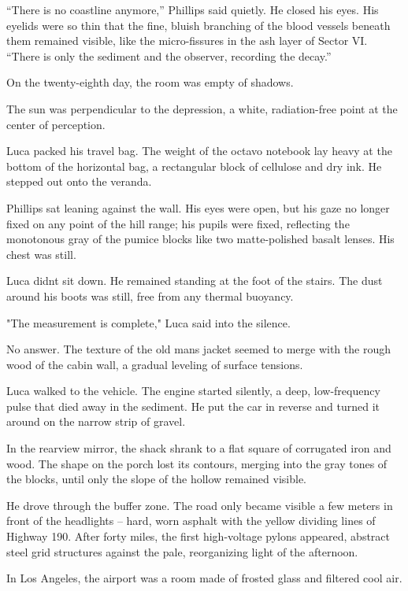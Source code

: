 \documentclass[
  ngerman,
]{article}
\begin{document}
``There is no coastline anymore,'' Phillips said quietly. He closed his
eyes. His eyelids were so thin that the fine, bluish branching of the
blood vessels beneath them remained visible, like the micro-fissures in
the ash layer of Sector VI. ``There is only the sediment and the
observer, recording the decay.''

On the twenty-eighth day, the room was empty of shadows.

The sun was perpendicular to the depression, a white, radiation-free
point at the center of perception.

Luca packed his travel bag. The weight of the octavo notebook lay heavy
at the bottom of the horizontal bag, a rectangular block of cellulose
and dry ink. He stepped out onto the veranda.

Phillips sat leaning against the wall. His eyes were open, but his gaze
no longer fixed on any point of the hill range; his pupils were fixed,
reflecting the monotonous gray of the pumice blocks like two
matte-polished basalt lenses. His chest was still.

Luca didn\textquotesingle t sit down. He remained standing at the foot
of the stairs. The dust around his boots was still, free from any
thermal buoyancy.

"The measurement is complete," Luca said into the silence.

No answer. The texture of the old man\textquotesingle s jacket seemed to
merge with the rough wood of the cabin wall, a gradual leveling of
surface tensions.

Luca walked to the vehicle. The engine started silently, a deep,
low-frequency pulse that died away in the sediment. He put the car in
reverse and turned it around on the narrow strip of gravel.

In the rearview mirror, the shack shrank to a flat square of corrugated
iron and wood. The shape on the porch lost its contours, merging into
the gray tones of the blocks, until only the slope of the hollow
remained visible.

He drove through the buffer zone. The road only became visible a few
meters in front of the headlights -- hard, worn asphalt with the yellow
dividing lines of Highway 190. After forty miles, the first high-voltage
pylons appeared, abstract steel grid structures against the pale,
reorganizing light of the afternoon.

In Los Angeles, the airport was a room made of frosted glass and
filtered cool air.
\end{document}
